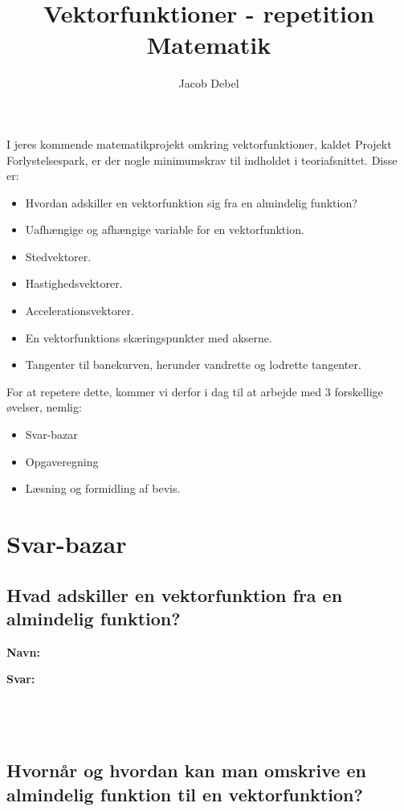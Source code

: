 \documentclass[a4paper, 12pt]{article}
\author{Jacob Debel}
\date{}
\title{Vektorfunktioner - repetition\\\medskip
\large Matematik}
\begin{document}
\maketitle
I jeres kommende matematikprojekt omkring vektorfunktioner, kaldet Projekt Forlystelsespark, er der nogle minimumskrav til indholdet i teoriafsnittet. Disse er:

\begin{itemize}
\item Hvordan adskiller en vektorfunktion sig fra en almindelig funktion?
\item Uafhængige og afhængige variable for en vektorfunktion.
\item Stedvektorer.
\item Hastighedsvektorer.
\item Accelerationsvektorer.
\item En vektorfunktions skæringspunkter med akserne.
\item Tangenter til banekurven, herunder vandrette og lodrette tangenter.
\end{itemize}

For at repetere dette, kommer vi derfor i dag til at arbejde med 3 forskellige øvelser, nemlig:

\begin{itemize}
\item Svar-bazar
\item Opgaveregning
\item Læsning og formidling af bevis.
\end{itemize}

\newpage
\section*{Svar-bazar}
\label{sec:org71bf028}

\subsection*{Hvad adskiller en vektorfunktion fra en almindelig funktion?}
\label{sec:org14b6748}

\textbf{Navn:}

\textbf{Svar:}

$$\phantom{a}$$

$$\phantom{a}$$

$$\phantom{a}$$
\subsection*{Hvornår og hvordan kan man omskrive en almindelig funktion til en vektorfunktion?}
\label{sec:orgae6c24a}
\end{document}
